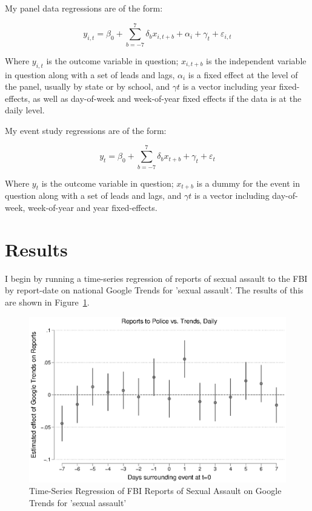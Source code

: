 \documentclass[AER,draftmode]{AEA}
\begin{document}

My panel data regressions are of the form: 

$$ 
y_{i,t} = \beta_{0} + \sum_{b=-7}^{7} \delta_{b} x_{i,t+b} + \alpha_{i} + \gamma_{t} + \varepsilon_{i,t}
$$

Where $y_{i,t}$ is the outcome variable in question; $x_{i,t+b}$ is the independent variable in question along with a set of leads and lags, $\alpha_{i}$ is a fixed effect at the level of the panel, usually by state or by school, and $\gamma{t}$ is a vector including year fixed-effects, as well as day-of-week and week-of-year fixed effects if the data is at the daily level.

My event study regressions are of the form: 

$$ 
y_{t} = \beta_{0} + \sum_{b=-7}^{7} \delta_{b} x_{t+b} + \gamma_{t} + \varepsilon_{t}
$$

Where $y_{t}$ is the outcome variable in question; $x_{t+b}$ is a dummy for the event in question along with a set of leads and lags, and $\gamma{t}$ is a vector including day-of-week, week-of-year and year fixed-effects.

\section{Results}

I begin by running a time-series regression of reports of sexual assault to the FBI by report-date on national Google Trends for 'sexual assault'. The results of this are shown in Figure~\ref{figure:police_trends_daily_logboth}.

\begin{figure}
\includegraphics[width=\linewidth]{figures/police_trend_daily_logboth.eps}
\caption{Time-Series Regression of FBI Reports of Sexual Assault on Google Trends for 'sexual assault'} \label{figure:police_trends_daily_logboth}
\end{figure}
\end{document}
